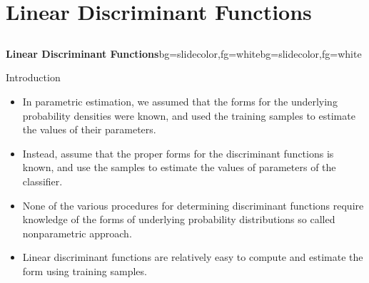 \section{Linear Discriminant Functions}
\subsection{}
\begin{frame}{}
\begin{variableblock}{\centering \Large \textbf{\vspace{4pt}\newline Linear Discriminant Functions\vspace{4pt}}}{bg=slidecolor,fg=white}{bg=slidecolor,fg=white}
\end{variableblock}
\end{frame}

\begin{frame}{Introduction}
\begin{itemize}
\item In parametric estimation, we assumed that the forms for the underlying {\color{mycolor1}probability densities were known}, and used the training samples to estimate the values of their parameters.
\item Instead, assume that the proper forms for the discriminant
functions is known, and use the samples to estimate the values of parameters of the classifier.
\item None of the various procedures for determining discriminant functions require
knowledge of the forms of underlying probability distributions so called {\color{mycolor2}nonparametric} approach.
\item Linear discriminant functions are relatively {\color{mycolor1}easy to compute} and estimate the form using training samples.
\end{itemize}
\end{frame}

